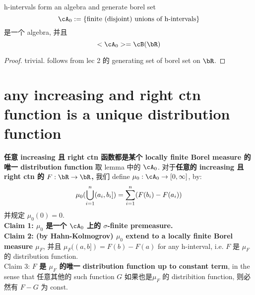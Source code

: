 \documentclass[lang=cn,11pt]{elegantbook}
\begin{document}
\begin{lemma}{h-intervals form an algebra and generate borel set}
    $$
    \cA_0 := \{  \text{finite (disjoint) unions of h-intervals}\}
    $$
是一个 algebra, 并且
$$
<\cA_0> = \cB(\bR)
$$
\end{lemma}
\begin{proof}
    trivial. follows from lec 2 的 generating set of borel set on $\bR$.
\end{proof}





\section{any increasing and right ctn function is a unique distribution function}


\begin{theorem}{\textbf{任意 increasing 且 right ctn 函数都是某个 locally finite Borel measure 的唯一 distribution function}}
取 lemma 中的 $\cA_0$.
对于\textbf{任意的 increasing 且 right ctn 的 $F: \bR \rar \bR$,} 我们 define $\mu_0: \cA_0 \rar [0,\infty]$, by:
$$
\mu_0(\bigcup_{i=1}^n (a_i, b_i]) = \sum_{i=1}^n (F(b_i) - F(a_i))
$$ 并规定 $\mu_0(0) = 0$.\\
\textbf{Claim 1: $\mu_0$ 是一个 $\cA_0$ 上的 $\sigma$-finite premeasure.}\\
\textbf{Claim 2: (by Hahn-Kolmogrov) $\mu_0$ extend to a locally finite Borel measure $\mu_F$}, 并且 $\mu_F ((a,b]) = F(b) - F(a)$ for any h-interval, i.e. $F$ 是 $\mu_F$ 的 distribution function.\\
Claim 3: \textbf{$F$ 是 $\mu_F$ 的唯一 distribution function up to constant term}, in the sense that 任意其他的 such function $G$ 如果也是$\mu_F$ 的 distribition function, 则必然有 $F-G$ 为 const. 
\end{theorem}
\end{document}
